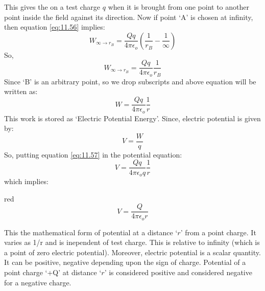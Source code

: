 This gives the on a test charge $q$ when it is brought from one
point to another point inside the field against its direction. Now if point `A'
is chosen at infinity, then equation \ref{eq:11.56} implies:
\begin{equation}
  W_{\infty\rightarrow r_{B}} = \frac{Qq}{4\pi\epsilon_{o} } (\frac{1}{r_{B}} - \frac{1}{\infty}) \nonumber
\end{equation}
So,
\begin{equation}
  W_{\infty\rightarrow r_{B}} = \frac{Qq}{4\pi\epsilon_{o} } \frac{1}{r_{B}} \nonumber
\end{equation}
Since `B' is an arbitrary point, so we drop subscripts and above equation will
be written as:
\begin{equation}\label{eq:11.57}
  W = \frac{Qq}{4\pi\epsilon_{o} } \frac{1}{r}
\end{equation}
This work is stored as `Electric Potential Energy'. Since, electric potential is given by:
\begin{equation}
  V = \frac{W}{q} \nonumber
\end{equation}
So, putting equation \ref{eq:11.57} in the potential equation:
\begin{equation}
  V = \frac{Qq}{4\pi\epsilon_{o} q} \frac{1}{r} \nonumber
\end{equation}
which implies:
\begin{mybox}{red}{}
\begin{equation}\label{eq:11.58}
  V = \frac{Q}{4\pi\epsilon_{o}r} 
\end{equation}
\end{mybox}
This the mathematical form of potential at a distance `$r$' from a
point charge. It varies as 1/r and is inependent of test charge.
This is relative to infinity (which is a point of zero electric potential).
Moreover, electric potential is a scalar quantity. It can be positive,
negative depending upon the sign of charge. Potential of a point charge ‘+Q’
at distance `$r$' is considered positive and considered negative for a
negative charge.

